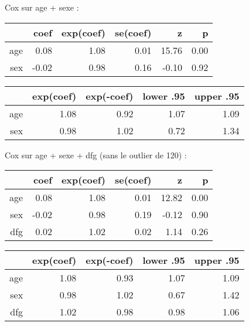 \documentclass[11pt,a4paper]{article}\usepackage[]{graphicx}\usepackage[]{color}
\begin{document}
Cox sur age + sexe :
\begin{table}[H]
\centering
\begin{tabular}{rrrrrr}
  \hline
 & coef & exp(coef) & se(coef) & z & p \\ 
  \hline
age & 0.08 & 1.08 & 0.01 & 15.76 & 0.00 \\ 
  sex & -0.02 & 0.98 & 0.16 & -0.10 & 0.92 \\ 
   \hline
\end{tabular}
\end{table}
\begin{table}[H]
\centering
\begin{tabular}{rrrrr}
  \hline
 & exp(coef) & exp(-coef) & lower .95 & upper .95 \\ 
  \hline
age & 1.08 & 0.92 & 1.07 & 1.09 \\ 
  sex & 0.98 & 1.02 & 0.72 & 1.34 \\ 
   \hline
\end{tabular}
\end{table}


Cox sur age + sexe + dfg (sans le outlier de 120) :
\begin{table}[H]
\centering
\begin{tabular}{rrrrrr}
  \hline
 & coef & exp(coef) & se(coef) & z & p \\ 
  \hline
age & 0.08 & 1.08 & 0.01 & 12.82 & 0.00 \\ 
  sex & -0.02 & 0.98 & 0.19 & -0.12 & 0.90 \\ 
  dfg & 0.02 & 1.02 & 0.02 & 1.14 & 0.26 \\ 
   \hline
\end{tabular}
\end{table}
\begin{table}[H]
\centering
\begin{tabular}{rrrrr}
  \hline
 & exp(coef) & exp(-coef) & lower .95 & upper .95 \\ 
  \hline
age & 1.08 & 0.93 & 1.07 & 1.09 \\ 
  sex & 0.98 & 1.02 & 0.67 & 1.42 \\ 
  dfg & 1.02 & 0.98 & 0.98 & 1.06 \\ 
   \hline
\end{tabular}
\end{table}
\end{document}

